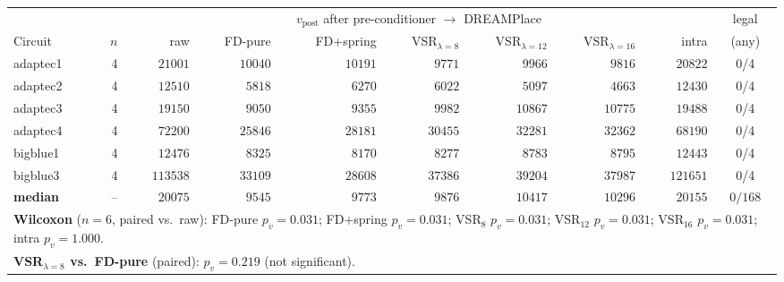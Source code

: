 \begin{tabular}{lr|rrrrrrr|c}
\toprule
& & \multicolumn{7}{c|}{$v_\text{post}$ after pre-conditioner $\to$ DREAMPlace} & legal \\
\cmidrule(lr){3-9}
Circuit & $n$ & raw & FD-pure & FD+spring & VSR$_{\lambda=8}$ & VSR$_{\lambda=12}$ & VSR$_{\lambda=16}$ & intra & (any) \\
\midrule
adaptec1 & 4 & $21001$ & $10040$ & $10191$ & $9771$ & $9966$ & $9816$ & $20822$ & 0/4 \\
adaptec2 & 4 & $12510$ & $5818$ & $6270$ & $6022$ & $5097$ & $4663$ & $12430$ & 0/4 \\
adaptec3 & 4 & $19150$ & $9050$ & $9355$ & $9982$ & $10867$ & $10775$ & $19488$ & 0/4 \\
adaptec4 & 4 & $72200$ & $25846$ & $28181$ & $30455$ & $32281$ & $32362$ & $68190$ & 0/4 \\
bigblue1 & 4 & $12476$ & $8325$ & $8170$ & $8277$ & $8783$ & $8795$ & $12443$ & 0/4 \\
bigblue3 & 4 & $113538$ & $33109$ & $28608$ & $37386$ & $39204$ & $37987$ & $121651$ & 0/4 \\
\midrule
\textbf{median} & -- & $20075$ & $9545$ & $9773$ & $9876$ & $10417$ & $10296$ & $20155$ & $0/168$ \\
\midrule
\multicolumn{10}{l}{\textbf{Wilcoxon} ($n{=}6$, paired vs.\ raw): FD-pure $p_v=0.031$; FD+spring $p_v=0.031$; VSR$_{8}$ $p_v=0.031$; VSR$_{12}$ $p_v=0.031$; VSR$_{16}$ $p_v=0.031$; intra $p_v=1.000$.} \\
\multicolumn{10}{l}{\textbf{VSR$_{\lambda=8}$ vs.\ FD-pure} (paired): $p_v=0.219$ (not significant).} \\
\bottomrule
\end{tabular}

